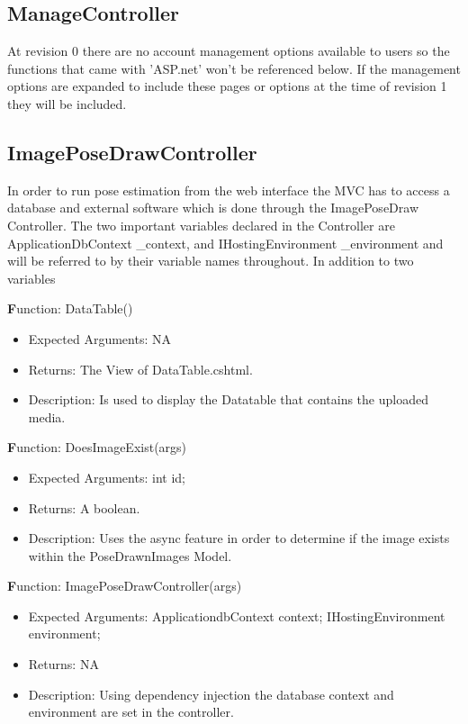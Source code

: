 \documentclass{scrreprt}
\begin{document}
\subsection{ManageController}
At revision 0 there are no account management options available to users so the functions that came with 'ASP.net' won't be referenced below. If the management options are expanded to include these pages or options at the time of revision 1 they will be included.

\subsection{ImagePoseDrawController}
In order to run pose estimation from the web interface the MVC has to access a database and external software which is done through the ImagePoseDraw Controller. The two important variables declared in the Controller are ApplicationDbContext \_context, and IHostingEnvironment \_environment and will be referred to by their variable names throughout. In addition to two variables

  \textbf Function: DataTable()
  \begin{itemize}
    \item Expected Arguments:
    NA
    \item Returns:
    The View of DataTable.cshtml.
    \item Description:
    Is used to display the Datatable that contains the uploaded media.
  \end{itemize}

  \textbf Function: DoesImageExist(args)
  \begin{itemize}
    \item Expected Arguments:
    int id;
    \item Returns:
    A boolean.
    \item Description:
    Uses the async feature in order to determine if the image exists within the PoseDrawnImages Model.
  \end{itemize}

  \textbf Function: ImagePoseDrawController(args)
  \begin{itemize}
    \item Expected Arguments:
    ApplicationdbContext context;
    IHostingEnvironment environment;
    \item Returns:
    NA
    \item Description:
    Using dependency injection the database context and environment are set in the controller.
  \end{itemize}
\end{document}
